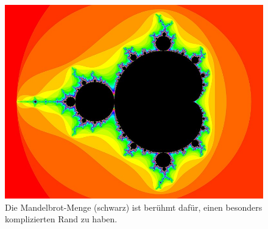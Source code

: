%
%
%
\begin{figure}
\centering
\includegraphics[width=\textwidth]{chapters/040-felder/images/mandelbrot.jpeg}
\caption{Die Mandelbrot-Menge (schwarz) ist berühmt dafür, einen
besonders komplizierten Rand zu haben.
\label{buch:felder:fig:mandelbrot}}
\end{figure}
